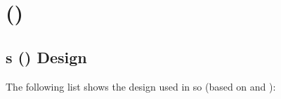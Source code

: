 \label{chap:chapter2}

\section[Stack Overflow]{ ()}
\label{sec:stackoverflow}

\subsection[Stack Overflows design]{s () Design}
\label{sec:stackoverflow_design}
The following list shows the design used in \gls{so} (based on \textcite[p.~6-7]{M.Sewak2010} and \textcite[p.~805]{Treude2011}):
